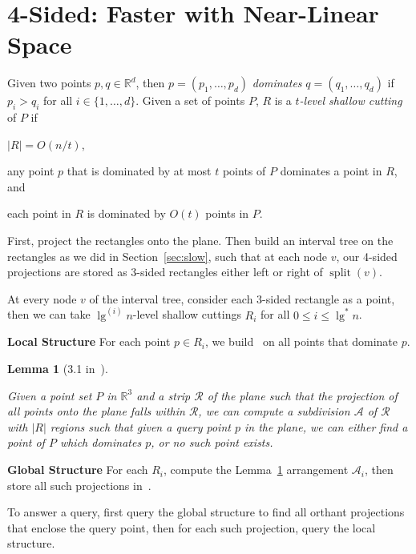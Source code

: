 \documentclass[letterpaper,12pt,twocolumn]{article}
\newcommand\lspace{\hspace{-0.5em}}
\DeclareMathOperator{\splt}{split}
\newcommand{\BigOh}[1]{O\!\left(#1\right)}
\newcommand\IR{\mathbb{R}}
\theoremstyle{plain}
\newtheorem{lemma}{Lemma}
\begin{document}
\section{\lspace{} 4-Sided: Faster with Near-Linear Space}
\label{sec:4sided}

Given two points $p,q \in \IR^d$, then $p = (p_1, \ldots, p_d)$
\emph{dominates} $q = (q_1, \ldots, q_d)$ if $p_i > q_i$ for all $i
\in \{1, \ldots, d \}$.  Given a set of points $P$, $R$ is a
\emph{$t$-level shallow cutting} of $P$ if
%
\begin{enumerate*}[label=(\roman*)] %
\item $|R| = \BigOh{n/t}$,
\item any point $p$ that is dominated by at most $t$ points of $P$
  dominates a point in $R$, and
\item each point in $R$ is dominated by $\BigOh{t}$ points in $P$.
\end{enumerate*}
%
First, project the rectangles onto the plane.  Then build an interval
tree on the rectangles as we did in Section~\ref{sec:slow}, such that
at each node $v$, our 4-sided projections are stored as 3-sided
rectangles either left or right of $\splt(v)$.

At every node $v$ of the interval tree, consider each 3-sided
rectangle as a point, then we can take $\lg^{(i)} n$-level shallow
cuttings $R_i$ for all $0 \le i \le \lg^* n$.

\textbf{Local Structure} For each point $p \in R_i$, we
build~\cite{afshani2008dominance} on all points that dominate $p$.

\begin{lemma}[3.1 in~\cite{rahul2015improved}]\label{lem:31}

  Given a point set $P$ in $\IR^3$ and a strip $\mathcal{R}$ of the
  plane such that the projection of all points onto the plane falls
  within $\mathcal{R}$, we can compute a subdivision $\mathcal{A}$ of
  $\mathcal{R}$ with $|R|$ regions such that given a query point $p$
  in the plane, we can either find a point of $P$ which dominates $p$,
  or no such point exists.

\end{lemma}

\textbf{Global Structure} For each $R_i$, compute the
Lemma~\ref{lem:31} arrangement $\mathcal{A}_i$, then store all such
projections in~\cite{chazelle1986filtering}.

To answer a query, first query the global structure to find all
orthant projections that enclose the query point, then for each such
projection, query the local structure.
\end{document}
